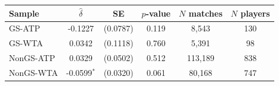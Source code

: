 \begin{tabular}{lccccc}
\toprule
Sample & $\hat{\delta}$ & SE & $p$-value & $N$ matches & $N$ players \\
\midrule
GS-ATP & -0.1227 & (0.0787) & 0.119 & 8,543 & 130 \\
GS-WTA & 0.0342 & (0.1118) & 0.760 & 5,391 & 98 \\
NonGS-ATP & 0.0329 & (0.0502) & 0.512 & 113,189 & 838 \\
NonGS-WTA & -0.0599$^{*}$ & (0.0320) & 0.061 & 80,168 & 747 \\
\bottomrule
\end{tabular}
